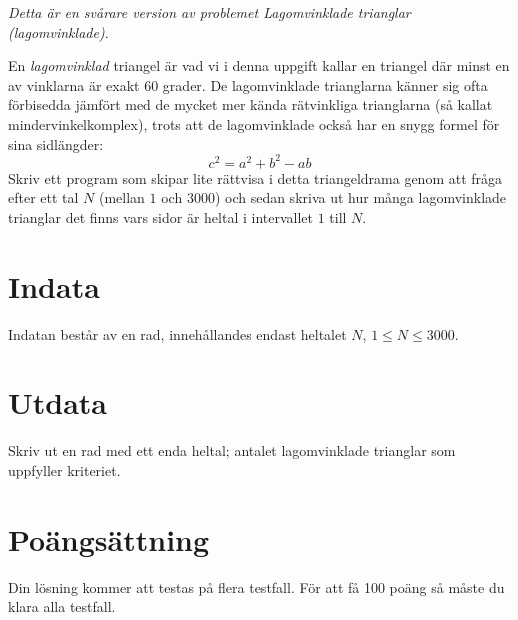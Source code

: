 \emph{Detta är en svårare version av problemet Lagomvinklade trianglar (lagomvinklade).}

En \emph{lagomvinklad} triangel är vad vi i denna uppgift kallar en triangel där minst en av vinklarna är exakt 60 grader. De lagomvinklade trianglarna känner sig ofta förbisedda jämfört med de mycket mer kända rätvinkliga trianglarna (så kallat mindervinkelkomplex), trots att de lagomvinklade också har en snygg formel för sina sidlängder:
\begin{equation*}
	c^2 = a^2 + b^2 - ab
\end{equation*}
Skriv ett program som skipar lite rättvisa i detta triangeldrama genom att fråga efter ett tal $N$ (mellan $1$ och $3000$) och sedan skriva ut hur många lagomvinklade trianglar det finns vars sidor är heltal i intervallet $1$ till $N$.

\section*{Indata}
Indatan består av en rad, innehållandes endast heltalet $N$, $1 \leq N \leq 3000$.

\section*{Utdata}
Skriv ut en rad med ett enda heltal; antalet lagomvinklade trianglar som uppfyller kriteriet.

\section*{Poängsättning}
Din lösning kommer att testas på flera testfall. För att få 100 poäng så måste du klara alla testfall.
